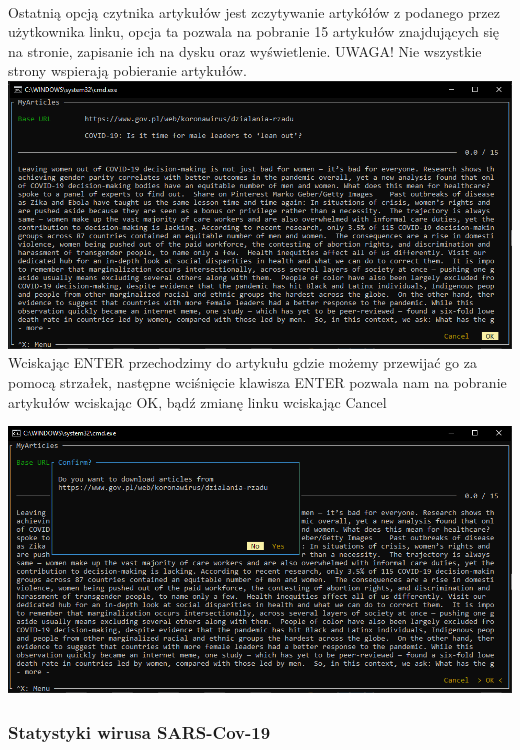 \documentclass{article}
\begin{document}
\paragraph{}
Ostatnią opcją czytnika artykułów jest zczytywanie artykółów z podanego przez użytkownika linku, opcja ta pozwala na pobranie 15 artykułów
znajdujących się na stronie, zapisanie ich na dysku oraz wyświetlenie. UWAGA! Nie wszystkie strony wspierają pobieranie artykułów. \\
\includegraphics[width=\textwidth]{images/my_articles_url.png}\\

Wciskając ENTER przechodzimy do artykułu gdzie możemy przewijać go za pomocą strzałek, następne wciśnięcie klawisza ENTER pozwala nam
na pobranie artykułów wciskając OK, bądź zmianę linku wciskając Cancel

\includegraphics[width=\textwidth]{images/my_articles_confirm.png}\\

\pagebreak

\subsubsection{Statystyki wirusa SARS-Cov-19}
\end{document}
